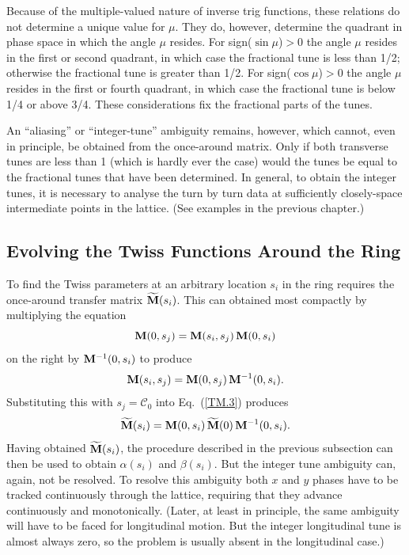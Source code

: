 \documentclass[]{article}
\begin{document}
Because of the multiple-valued nature of inverse trig functions,
these relations do not determine a unique value for $\mu$. They do,
however, determine the quadrant in phase space in which the angle $\mu$
resides. For sign($\sin\mu$)$>$0 the angle $\mu$ resides in the first
or second quadrant, in which case the fractional tune is less than 1/2;
otherwise the fractional tune is greater than 1/2.
For sign($\cos\mu$)$>$0 the angle $\mu$ resides in the first
or fourth quadrant, in which case the fractional tune is below 1/4
or above 3/4. These considerations fix the fractional parts of
the tunes.

An ``aliasing'' or ``integer-tune'' ambiguity remains, however,
which cannot, even in principle, be obtained from the once-around 
matrix. Only if both transverse tunes are less than 1 (which is 
hardly ever the
case) would the tunes be equal to the fractional tunes that have
been determined. In general, to obtain the integer tunes, it is 
necessary to analyse the turn by turn data at sufficiently closely-space 
intermediate points in the lattice. (See examples in the previous chapter.)

\subsection{Evolving the Twiss Functions Around the Ring}
To find the Twiss parameters at an arbitrary location $s_i$ in the
ring requires the once-around transfer matrix ${\widetilde{\bf M}}(s_i)$. 
This can obtained most compactly by multiplying the equation
%
\begin{equation}
{\bf M}(0,s_j)
 =
{\bf M}(s_i,s_j)\,{\bf M}(0,s_i)
\label{TM.9}
\end{equation}
%
on the right by ${\bf M}^{-1}(0,s_i)$ to produce
%
\begin{equation}
{\bf M}(s_i,s_j)
 =
{\bf M}(0,s_j)\,{\bf M}^{-1}(0,s_i).
\label{TM.10}
\end{equation}
%
Substituting this with $s_j=\mathcal{C}_0$ into Eq.~(\ref{TM.3}) 
produces
%
\begin{equation}
\widetilde{\bf M}(s_i)
 =
{\bf M}(0,s_i)\,\widetilde{\bf M}(0)\,{\bf M}^{-1}(0,s_i).
\label{TM.11}
\end{equation}
%
Having obtained ${\widetilde{\bf M}}(s_i)$,
the procedure described in the previous subsection can
then be used to obtain $\alpha(s_i)$ and $\beta(s_i)$.
But the integer tune ambiguity can, again, not be
resolved. To resolve this ambiguity both $x$ and $y$ phases
have to be tracked continuously through the lattice,
requiring that they advance continuously and monotonically.
(Later, at least in principle, the same ambiguity will 
have to be faced for longitudinal motion. But the
integer longitudinal tune is almost always zero, so the
problem is usually absent in the longitudinal case.)
\end{document}
